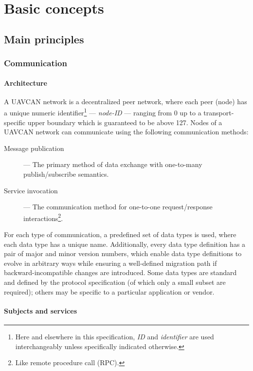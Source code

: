\chapter{Basic concepts}\label{sec:basic_concepts}

\section{Main principles}

\subsection{Communication}

\subsubsection{Architecture}

A UAVCAN network is a decentralized peer network, where each peer (node) has a unique
numeric identifier\footnote{Here and elsewhere in this specification, \emph{ID} and \emph{identifier} are used
interchangeably unless specifically indicated otherwise.}
--- \emph{node-ID} --- ranging from 0 up to a transport-specific upper boundary which is guaranteed to be above 127.
Nodes of a UAVCAN network can communicate using the following communication methods:

\begin{description}
    \item[Message publication] --- The primary method of data exchange with one-to-many publish/subscribe semantics.
    \item[Service invocation] --- The communication method for one-to-one request/response
    interactions\footnote{Like remote procedure call (RPC).}.
\end{description}

For each type of communication, a predefined set of data types is used,
where each data type has a unique name.
Additionally, every data type definition has a pair of major and minor version numbers,
which enable data type definitions to evolve in arbitrary ways while ensuring a well-defined
migration path if backward-incompatible changes are introduced.
Some data types are standard and defined by the protocol specification (of which only a small
subset are required); others may be specific to a particular application or vendor.

\subsubsection{Subjects and services}

